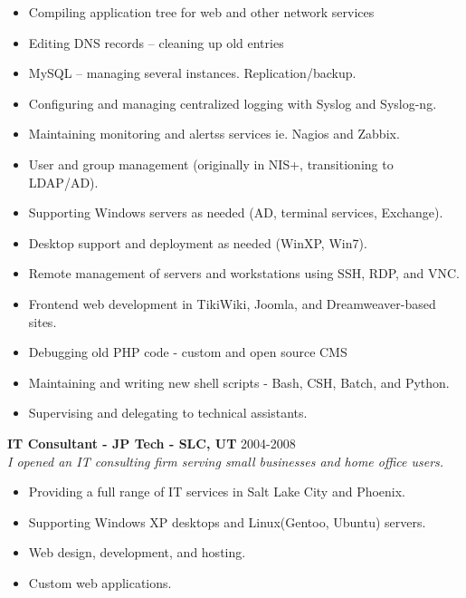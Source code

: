 \documentclass[line,margin]{res}
\begin{document}
\begin{resume}
\begin{itemize}
   \item Compiling application tree for web and other network services
   \item Editing DNS records – cleaning up old entries
   \item MySQL – managing several instances. Replication/backup. 
   \item Configuring and managing centralized logging with Syslog and Syslog-ng.
   \item Maintaining monitoring and alertss services ie. Nagios and Zabbix.
   \item User and group management (originally in NIS+, transitioning to LDAP/AD).
   \item Supporting Windows servers as needed (AD, terminal services, Exchange).
   \item Desktop support and deployment as needed (WinXP, Win7).
   \item Remote management of servers and workstations using SSH, RDP, and VNC.
   \item Frontend web development in TikiWiki, Joomla, and Dreamweaver-based sites.
   \item Debugging old PHP code - custom and open source CMS
   \item Maintaining and writing new shell scripts - Bash, CSH, Batch, and Python.
   \item Supervising and delegating to technical assistants.
   \end{itemize}
 {\bf IT Consultant - JP Tech - SLC, UT} \hfill 2004-2008\\
 {\sl I opened an IT consulting firm serving small businesses and home office users.}
  \begin{itemize} \itemsep -2pt
  \item Providing a full range of IT services in Salt Lake City and Phoenix.    
  \item Supporting Windows XP desktops and Linux(Gentoo, Ubuntu) servers.
  \item Web design, development, and hosting.
  \item Custom web applications.
  \end{itemize}


\end{resume}
\end{document}
